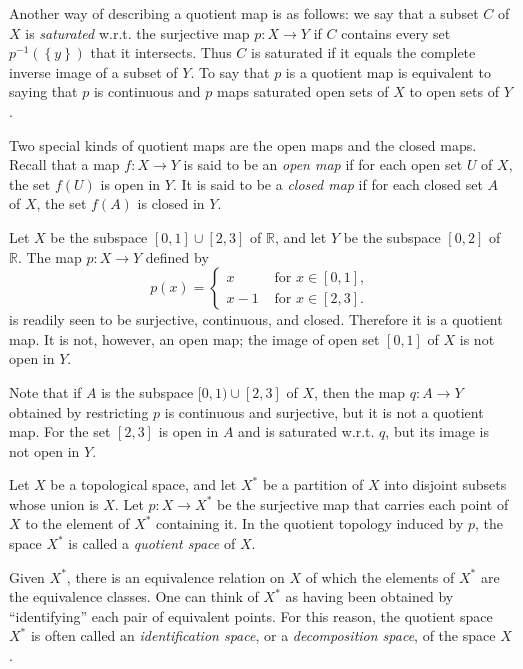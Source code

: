 Another way of describing a quotient map is as follows: we say that a subset \( C \) of \( X \) is \emph{saturated} w.r.t. the surjective map \( p: X \to Y \) if \( C \) contains every set \( p^{-1}(\left\lbrace y \right\rbrace) \) that it intersects.
Thus \( C \) is saturated if it equals the complete inverse image of a subset of \( Y \).
To say that \( p \) is a quotient map is equivalent to saying that \( p \) is continuous and \( p \) maps saturated open sets of \( X \) to open sets of \( Y \).

Two special kinds of quotient maps are the open maps and the closed maps.
Recall that a map \( f: X \to Y \) is said to be an \emph{open map} if for each open set \( U \) of \( X \), the set \( f(U) \) is open in \( Y \).
It is said to be a \emph{closed map} if for each closed set \( A \) of \( X \), the set \( f(A) \) is closed in \( Y \).

\begin{example}
  Let \( X \) be the subspace \( [0, 1] \cup [2, 3] \) of \( \mathbb{R} \), and let \( Y \) be the subspace \( [0, 2] \) of \( \mathbb{R} \).
  The map \( p: X \to Y \) defined by
  \[
    p(x) = \begin{cases}
      x & \text{ for } x \in [0, 1],\\
      x - 1 & \text{ for } x \in [2, 3]
    .\end{cases}
  \]
  is readily seen to be surjective, continuous, and closed.
  Therefore it is a quotient map.
  It is not, however, an open map; the image of open set \( [0, 1] \) of \( X \) is not open in \( Y \).

  Note that if \( A \) is the subspace \( [0, 1) \cup [2, 3] \) of \( X \), then the map \( q: A \to Y \) obtained by restricting \( p \) is continuous and surjective, but it is not a quotient map.
  For the set \( [2, 3] \) is open in \( A \) and is saturated w.r.t. \( q \), but its image is not open in \( Y \).
\end{example}

\begin{definition}
  Let \( X \) be a topological space, and let \( X^* \) be a partition of \( X \) into disjoint subsets whose union is \( X \).
  Let \( p: X \to X^* \) be the surjective map that carries each point of \( X \) to the element of \( X^* \) containing it.
  In the quotient topology induced by \( p \), the space \( X^* \) is called a \emph{quotient space} of \( X \).
\end{definition}
\begin{remark}
  Given \( X^* \), there is an equivalence relation on \( X \) of which the elements of \( X^* \) are the equivalence classes.
  One can think of \( X^* \) as having been obtained by ``identifying'' each pair of equivalent points.
  For this reason, the quotient space \( X^* \) is often called an \emph{identification space}, or a \emph{decomposition space}, of the space \( X \).
\end{remark}


